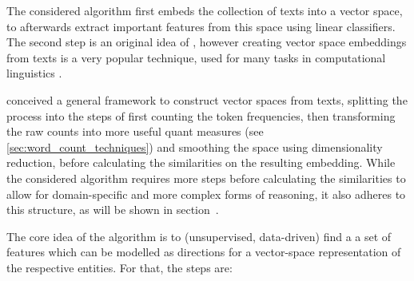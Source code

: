 
The considered algorithm first embeds the collection of texts into a vector space, to afterwards extract important features from this space using linear classifiers. The second step is an original idea of \cite{Derrac2015}, however creating vector space embeddings from texts is a very popular technique, used for many tasks in computational linguistics \cite{Mikolov:Regularities,Mikolov2013a,Guo,Lowe,Turney2010}. %

 \textcite{Lowe} conceived a general framework to construct vector spaces from texts, splitting the process into the steps of first counting the token frequencies, then transforming the raw counts into more useful \gls{quant} measures (see \ref{sec:word_count_techniques}) %
  and smoothing the space using dimensionality reduction, before calculating the similarities on the resulting embedding. While the considered algorithm requires more steps before calculating the similarities to allow for domain-specific and more complex forms of reasoning, it also adheres to this structure, as will be shown in section~.

The core idea of the algorithm is to (unsupervised, data-driven) find a a set of features which can be modelled as directions for a vector-space representation of the respective entities. For that, the steps are:

